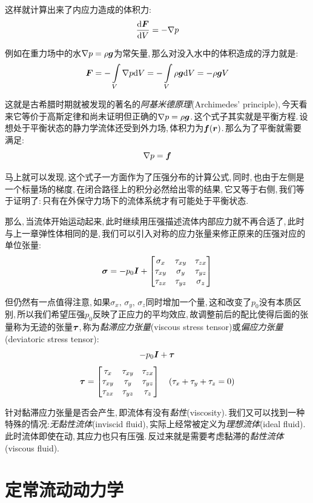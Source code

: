 这样就计算出来了内应力造成的体积力:
\[\frac{\textrm{d}\boldsymbol{F}}{\textrm{d} V}=-\nabla p\]

例如在重力场中的水$\nabla p=\rho \boldsymbol{g}$为常矢量,\,那么对没入水中的体积造成的浮力就是:
\[\boldsymbol{F}=-\int\limits_{V}\nabla p\textrm{d} V=-\int\limits_{V}\rho \boldsymbol{g}\textrm{d} V=-\rho \boldsymbol{g}V\]

这就是古希腊时期就被发现的著名的\emph{阿基米德原理}(Archimedes' principle),\,今天看来它等价于高斯定律和尚未证明但正确的$\nabla p=\rho \boldsymbol{g}$.\,这个式子其实就是平衡方程.\,设想处于平衡状态的静力学流体还受到外力场,\,体积力为$\boldsymbol{f}(\boldsymbol{r})$.\,那么为了平衡就需要满足:
\[\nabla p=\boldsymbol{f}\]

马上就可以发现,\,这个式子一方面作为了压强分布的计算公式,\,同时,\,也由于左侧是一个标量场的梯度,\,在闭合路径上的积分必然给出零的结果,\,它又等于右侧,\,我们等于证明了:\,只有在外保守力场下的流体系统才有可能处于平衡状态.

\vspace{0.5cm}

那么,\,当流体开始运动起来,\,此时继续用压强描述流体内部应力就不再合适了,\,此时与上一章弹性体相同的是,\,我们可以引入对称的应力张量来修正原来的压强对应的单位张量:
\[\boldsymbol{\sigma}=-p_0\boldsymbol{I}+\begin{bmatrix}\sigma_{x}&\tau_{xy}&\tau_{zx}\\\tau_{xy}&\sigma_{y}&\tau_{yz}\\\tau_{zx}&\tau_{yz}&\sigma_{z}\end{bmatrix}\]

但仍然有一点值得注意,\,如果$\sigma_x,\,\sigma_y,\,\sigma_z$同时增加一个量,\,这和改变了$p_0$没有本质区别,\,所以我们希望压强$p_0$反映了正应力的平均效应,\,故调整前后的配比使得后面的张量称为无迹的张量$\boldsymbol{\tau}$,\,称为\emph{黏滞应力张量}(viscous stress tensor)或\emph{偏应力张量}(deviatoric stress tensor):
\[-p_0\boldsymbol{I}+\boldsymbol{\tau}\]
\[\boldsymbol{\tau}=\begin{bmatrix}\tau_{x}&\tau_{xy}&\tau_{zx}\\\tau_{xy}&\tau_{y}&\tau_{yz}\\\tau_{zx}&\tau_{yz}&\tau_{z}\end{bmatrix}\quad(\tau_{x}+\tau_{y}+\tau_{z}=0)\]

针对黏滞应力张量是否会产生,\,即流体有没有\emph{黏性}(viscosity).\,我们又可以找到一种特殊的情况:\emph{无黏性流体}(inviscid fluid),\,实际上经常被定义为\emph{理想流体}(ideal fluid).\,此时流体即使在动,\,其应力也只有压强.\,反过来就是需要考虑黏滞的\emph{黏性流体}(viscous fluid).



\section{定常流动动力学}

